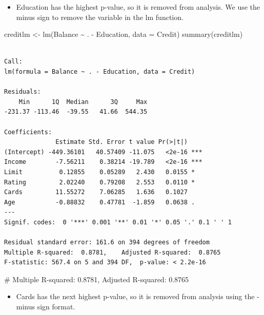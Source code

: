 \documentclass[
  letterpaper,
  DIV=11,
  numbers=noendperiod]{scrreprt}
\newenvironment{Shaded}{\begin{snugshade}}{\end{snugshade}}
\newcommand{\AttributeTok}[1]{\textcolor[rgb]{0.40,0.45,0.13}{#1}}
\newcommand{\CommentTok}[1]{\textcolor[rgb]{0.37,0.37,0.37}{#1}}
\newcommand{\FunctionTok}[1]{\textcolor[rgb]{0.28,0.35,0.67}{#1}}
\newcommand{\NormalTok}[1]{\textcolor[rgb]{0.00,0.23,0.31}{#1}}
\newcommand{\OtherTok}[1]{\textcolor[rgb]{0.00,0.23,0.31}{#1}}
\newcommand{\SpecialCharTok}[1]{\textcolor[rgb]{0.37,0.37,0.37}{#1}}
\providecommand{\tightlist}{%
  \setlength{\itemsep}{0pt}\setlength{\parskip}{0pt}}\usepackage{longtable,booktabs,array}
\begin{document}
\begin{itemize}
\tightlist
\item
  Education has the highest p-value, so it is removed from analysis. We
  use the minus sign to remove the variable in the lm function.
\end{itemize}

\begin{Shaded}
\begin{Highlighting}[]
\NormalTok{creditlm }\OtherTok{\textless{}{-}} \FunctionTok{lm}\NormalTok{(Balance }\SpecialCharTok{\textasciitilde{}}\NormalTok{ . }\SpecialCharTok{{-}}\NormalTok{ Education, }\AttributeTok{data =}\NormalTok{ Credit)}
\FunctionTok{summary}\NormalTok{(creditlm)}
\end{Highlighting}
\end{Shaded}

\begin{verbatim}

Call:
lm(formula = Balance ~ . - Education, data = Credit)

Residuals:
    Min      1Q  Median      3Q     Max 
-231.37 -113.46  -39.55   41.66  544.35 

Coefficients:
              Estimate Std. Error t value Pr(>|t|)    
(Intercept) -449.36101   40.57409 -11.075   <2e-16 ***
Income        -7.56211    0.38214 -19.789   <2e-16 ***
Limit          0.12855    0.05289   2.430   0.0155 *  
Rating         2.02240    0.79208   2.553   0.0110 *  
Cards         11.55272    7.06285   1.636   0.1027    
Age           -0.88832    0.47781  -1.859   0.0638 .  
---
Signif. codes:  0 '***' 0.001 '**' 0.01 '*' 0.05 '.' 0.1 ' ' 1

Residual standard error: 161.6 on 394 degrees of freedom
Multiple R-squared:  0.8781,    Adjusted R-squared:  0.8765 
F-statistic: 567.4 on 5 and 394 DF,  p-value: < 2.2e-16
\end{verbatim}

\begin{Shaded}
\begin{Highlighting}[]
\CommentTok{\# Multiple R{-}squared: 0.8781, Adjusted R{-}squared: 0.8765}
\end{Highlighting}
\end{Shaded}

\begin{itemize}
\tightlist
\item
  Cards has the next highest p-value, so it is removed from analysis
  using the - minus sign format.
\end{itemize}
\end{document}
